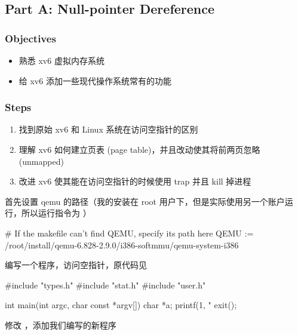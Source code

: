 \subsection{Part A: Null-pointer Dereference}
\subsubsection{Objectives}


\begin{itemize}
    \item 熟悉 xv6 虚拟内存系统
    \item 给 xv6 添加一些现代操作系统常有的功能
\end{itemize}

\subsubsection{Steps}

\begin{enumerate}
    \item 找到原始 xv6 和 Linux 系统在访问空指针的区别
    \item 理解 xv6 如何建立页表 (page table)，并且改动使其将前两页忽略 (unmapped)
    \item 改进 xv6 使其能在访问空指针的时候使用 trap 并且 kill 掉进程
\end{enumerate}

首先设置 qemu 的路径（我的安装在 root 用户下，但是实际使用另一个账户运行，所以运行指令为 ）

\begin{textcode}
    # If the makefile can't find QEMU, specify its path here
    QEMU := /root/install/qemu-6.828-2.9.0/i386-softmmu/qemu-system-i386
\end{textcode}

编写一个程序，访问空指针，原代码见 

\begin{ccode}
    #include "types.h"
    #include "stat.h"
    #include "user.h"
        
    int main(int argc, char const *argv[])
    {
        char *a;
        printf(1, "%
        exit();
    }
\end{ccode}

修改 ，添加我们编写的新程序


